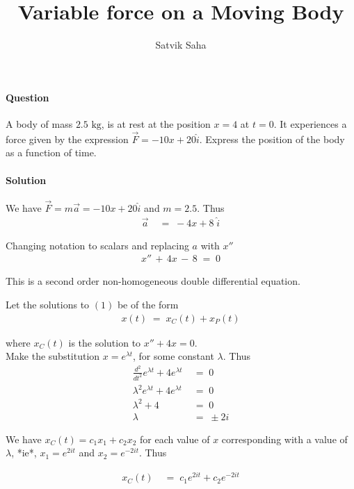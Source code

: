 \documentclass[11pt,reqno]{article}
\title{Variable force on a Moving Body}
\author{Satvik Saha}
\date{}
\begin{document}
\maketitle

\paragraph{Question}
A body of mass $2.5 \text{ kg}$, is at rest at the position $x = 4$ at $t = 0$.
It experiences a force given by the expression $\vec{F} = -10x + 20 \hat{i}$. Express the position of the
body as a function of time.

\paragraph{Solution}
We have $\vec{F} = m\vec{a} = -10x + 20 \hat{i}$ and $m = 2.5$. Thus
\begin{align*}
\vec{a} \;&=\; -4x + 8 \;\hat{i}
\end{align*}

Changing notation to scalars and replacing $a$ with $x''$
\begin{align*}
\boxed{x'' \,+\, 4x \,-\, 8 \;=\; 0} \tag{1}
\end{align*}

This is a second order non-homogeneous double differential equation.

Let the solutions to $(1)$ be of the form 
\begin{align*}
x(t) \;=\; x_C(t) + x_P(t) \tag{2}
\end{align*}

where $x_C(t)$ is the solution to $x'' + 4x = 0$. \\

Make the substitution $x = e^{\lambda t}$, for some constant $\lambda$. Thus
\begin{align*}
\frac{d^2}{dt^2}e^{\lambda t} + 4e^{\lambda t} \;&=\; 0    \\
\lambda^2 e^{\lambda t} + 4e^{\lambda t} \;&=\; 0    \\
\lambda^2 + 4 \;&=\; 0    \\
\lambda \;&=\; \pm 2i
\end{align*}

We have $x_C(t) = c_1x_1 + c_2x_2$ for each value of $x$ corresponding with a value of 
$\lambda$, *ie*, $x_1 = e^{2it}$ and $x_2 = e^{-2it}$. Thus

\begin{align*}
x_C(t) \;&=\; c_1 e^{2it} + c_2 e^{-2it}
\end{align*}
\end{document}

